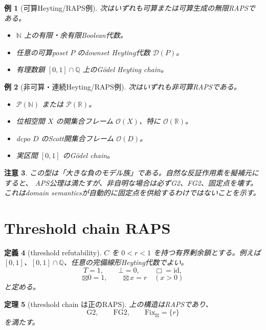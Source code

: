 \documentclass[uplatex,dvipdfmx,a4paper,10pt]{jsarticle}
\newtheorem{theorem}{定理}
\newtheorem{definition}[theorem]{定義}
\newtheorem{example}[theorem]{例}
\newtheorem{remark}[theorem]{注意}
\newcommand{\Gtwo}{\mathrm{G2}}
\newcommand{\FGtwo}{\mathrm{FG2}}
\newcommand{\Fix}{\mathrm{Fix}}
\newcommand{\bt}{\boxtimes}
\newcommand{\Pow}{\mathcal P}
\begin{document}
\begin{example}[可算Heyting/RAPS例]
次はいずれも可算または可算生成の無限RAPSである。
\begin{itemize}
  \item \(\mathbb N\) 上の有限・余有限Boolean代数。
  \item 任意の可算poset \(P\) のdownset Heyting代数 \(\mathcal D(P)\)。
  \item 有理数鎖 \([0,1]\cap\mathbb Q\) 上のGödel Heyting chain。
\end{itemize}
\end{example}

\begin{example}[非可算・連続Heyting/RAPS例]
次はいずれも非可算RAPSである。
\begin{itemize}
  \item \(\Pow(\mathbb N)\) または \(\Pow(\mathbb R)\)。
  \item 位相空間 \(X\) の開集合フレーム \(\mathcal O(X)\)、特に \(\mathcal O(\mathbb R)\)。
  \item dcpo \(D\) のScott開集合フレーム \(\mathcal O(D)\)。
  \item 実区間 \([0,1]\) のGödel chain。
\end{itemize}
\end{example}

\begin{remark}
この型は「大きな負のモデル族」である。自然な反証作用素を擬補元にすると、
APS公理は満たすが、非自明な場合は必ずG2、FG2、固定点を壊す。
これはdomain semanticsが自動的に固定点を供給するわけではないことを示す。
\end{remark}

\section{Threshold chain RAPS}

\begin{definition}[threshold refutability]
\(C\) を \(0<r<1\) を持つ有界剰余鎖とする。例えば
\([0,1]\)、\([0,1]\cap\mathbb Q\)、任意の完備線形Heyting代数でよい。
\[
T=1,\qquad \bot=0,\qquad \Box=\mathrm{id},
\]
\[
\bt0=1,\qquad \bt x=r\quad(x>0)
\]
と定める。
\end{definition}

\begin{theorem}[threshold chain は正のRAPS]
上の構造はRAPSであり、
\[
\Gtwo,\qquad \FGtwo,\qquad \Fix_{\bt}=\{r\}
\]
を満たす。
\end{theorem}
\end{document}
